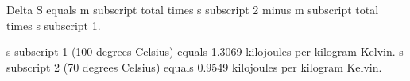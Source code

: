 Delta S equals m subscript total times s subscript 2 minus m subscript total times s subscript 1.

s subscript 1 (100 degrees Celsius) equals 1.3069 kilojoules per kilogram Kelvin.  
s subscript 2 (70 degrees Celsius) equals 0.9549 kilojoules per kilogram Kelvin.